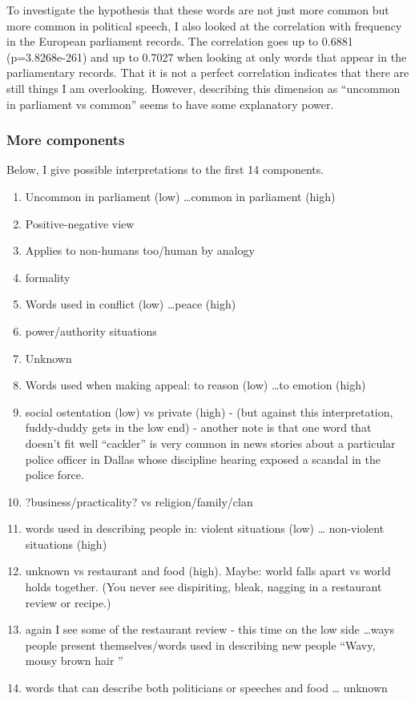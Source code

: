 \documentclass[eric_thesis.tex]{subfiles}
\begin{document}
To investigate the hypothesis that these words are not just more common but 
more common in political speech, I also looked at the correlation with 
frequency in the European parliament records. The correlation goes up to 0.6881 
(p=3.8268e-261) and up to 0.7027 when looking at only words that appear in the 
parliamentary records. That it is not a perfect correlation indicates that 
there are still things I am overlooking. However, describing this dimension as 
``uncommon in parliament vs common'' seems to have some explanatory power.

\subsubsection{More components}

Below, I give possible interpretations to the first 14 components.

\begin{enumerate}
 \item Uncommon in parliament (low) \ldots common in parliament (high)
 \item Positive-negative view
 \item Applies to non-humans too/human by analogy
 \item formality
 \item Words used in conflict (low) \ldots peace (high)
 \item power/authority situations
 \item Unknown
 \item Words used when making appeal: to reason (low) \ldots to emotion (high)
 \item social ostentation (low) vs private (high) - (but against this 
       interpretation, fuddy-duddy gets in the low end) - another note is that 
       one word that doesn't fit well ``cackler'' is very common in news 
       stories about a particular police officer in Dallas whose discipline 
       hearing exposed a scandal in the police force.
 \item ?business/practicality? vs religion/family/clan
 \item words used in describing people in: violent situations (low) \ldots 
       non-violent situations (high)
 \item unknown vs restaurant and food (high). Maybe: world falls apart vs world 
       holds together. (You never see dispiriting, bleak, nagging in a 
       restaurant review or recipe.)
 \item again I see some of the restaurant review - this time on the low side 
       \ldots ways people present themselves/words used in describing new 
       people ``Wavy, mousy brown hair ''
 \item words that can describe both politicians or speeches and food \ldots 
       unknown
\end{enumerate}
\end{document}
